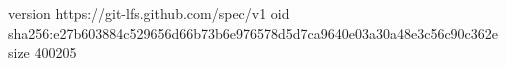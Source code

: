 version https://git-lfs.github.com/spec/v1
oid sha256:e27b603884c529656d66b73b6e976578d5d7ca9640e03a30a48e3c56c90c362e
size 400205
